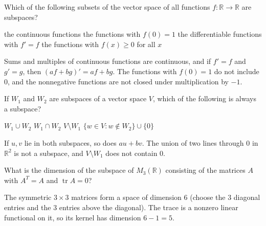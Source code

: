 \begin{question}[id=vs-6, type=msq]
Which of the following subsets of the vector space of all functions $f : \mathbb{R} \to \mathbb{R}$ are subspaces?
\begin{options}
  \correct the continuous functions
  \option the functions with $f(0) = 1$
  \correct the differentiable functions with $f' = f$
  \option the functions with $f(x) \ge 0$ for all $x$
\end{options}
\begin{solution}
Sums and multiples of continuous functions are continuous, and if $f' = f$ and $g' = g$, then $(af + bg)' = af + bg$. The functions with $f(0) = 1$ do not include 0, and the nonnegative functions are not closed under multiplication by $-1$.
\end{solution}
\end{question}

\begin{question}[id=vs-7]
If $W_1$ and $W_2$ are subspaces of a vector space $V$, which of the following is always a subspace?
\begin{options}
  \option $W_1 \cup W_2$
  \correct $W_1 \cap W_2$
  \option $V \setminus W_1$
  \option $\{w \in V : w \notin W_2\} \cup \{0\}$
\end{options}
\begin{solution}
If $u, v$ lie in both subspaces, so does $au + bv$. The union of two lines through 0 in $\mathbb{R}^2$ is not a subspace, and $V \setminus W_1$ does not contain 0.
\end{solution}
\end{question}

\begin{question}[id=vs-8, marks=2]
What is the dimension of the subspace of $M_3(\mathbb{R})$ consisting of the matrices $A$ with $A^T = A$ and $\operatorname{tr} A = 0$?
\begin{solution}
The symmetric $3 \times 3$ matrices form a space of dimension 6 (choose the 3 diagonal entries and the 3 entries above the diagonal). The trace is a nonzero linear functional on it, so its kernel has dimension $6 - 1 = 5$.
\end{solution}
\end{question}

